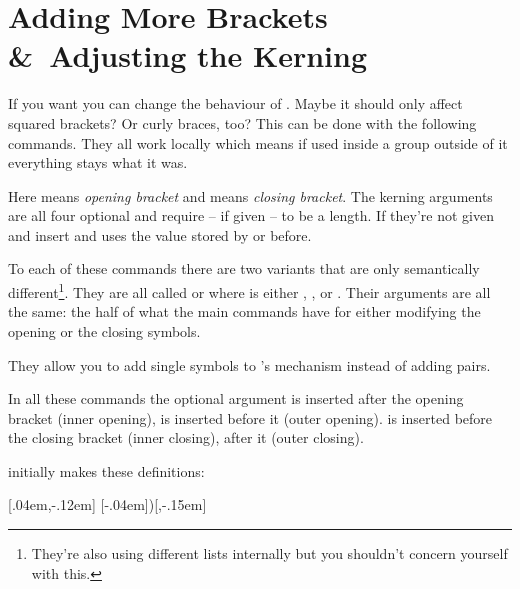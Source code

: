 \documentclass[DIV10,toc=index,toc=bib]{cnpkgdoc}
\makeatletter
\providecommand*\sinceversion[1]{%
  \@bsphack
  \marginnote{%
    \footnotesize\sffamily\RaggedRight
    \textcolor{black!75}{Introduced in version~#1}}%
  \@esphack}
\makeatother
\begin{document}
\section{Adding More Brackets \&\ Adjusting the Kerning}
 If you want you
can change the behaviour of \embrac.  Maybe it should only affect squared
brackets?  Or curly braces, too?  This can be done with the following
commands.  They all work locally which means if used inside a group outside of
it everything stays what it was.
\begin{beschreibung}
\end{beschreibung}
Here  means \emph{opening bracket} and  means
\emph{closing bracket}.  The kerning arguments are all four optional and
require -- if given -- to be a length.  If they're not given  and
 insert \code{0pt} and  uses the value stored
by  or  before.

\sinceversion{0.4}To each of these commands there are two variants that are
only semantically different\footnote{They're also using different lists
  internally but you shouldn't concern yourself with this.}.  They are all
called  or  where  is
either , ,  or .  Their
arguments are all the same: the half of what the main commands have for either
modifying the opening or the closing symbols.
\begin{beschreibung}
\end{beschreibung}
They allow you to add single symbols to \embrac's mechanism instead of adding
pairs.

In all these commands the optional argument  is inserted after
the opening bracket (inner opening),  is inserted before it
(outer opening).  is inserted before the closing bracket
(inner closing),  after it (outer closing).

\embrac initially makes these definitions:
\begin{beispiel}
 \AddEmph{[}{]}[.04em,-.12em]
 \AddEmph{(}[-.04em]{)}[,-.15em]
\end{beispiel}
\end{document}
